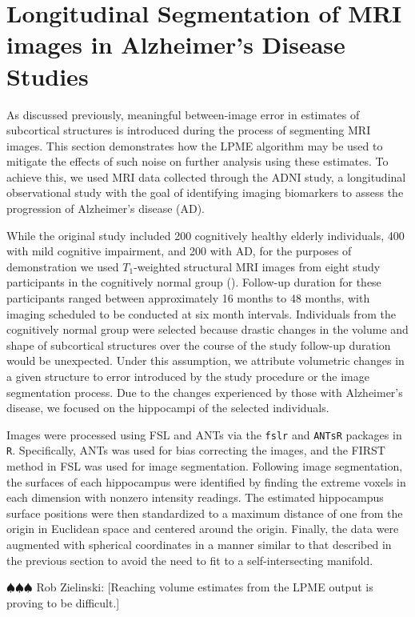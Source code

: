 \documentclass[11pt,reqno]{article}
\newcommand{\zielinski}[1]{{\color{blue} \sf $\spadesuit\spadesuit\spadesuit$ Rob Zielinski: [#1]}}
\theoremstyle{definition}
\begin{document}
\section{Longitudinal Segmentation of MRI images in Alzheimer's Disease Studies}\label{s:application}

As discussed previously, meaningful between-image error in estimates of subcortical structures is introduced during the process of segmenting MRI images. This section demonstrates how the LPME algorithm may be used to mitigate the effects of such noise on further analysis using these estimates. To achieve this, we used MRI data collected through the ADNI study, a longitudinal observational study with the goal of identifying imaging biomarkers to assess the progression of Alzheimer's disease (AD). 

While the original study included 200 cognitively healthy elderly individuals, 400 with mild cognitive impairment, and 200 with AD, for the purposes of demonstration we used $T_1$-weighted structural MRI images from eight study participants in the cognitively normal group (\cite{jack2008adni}). Follow-up duration for these participants ranged between approximately 16 months to 48 months, with imaging scheduled to be conducted at six month intervals. Individuals from the cognitively normal group were selected because drastic changes in the volume and shape of subcortical structures over the course of the study follow-up duration would be unexpected. Under this assumption, we attribute volumetric changes in a given structure to error introduced by the study procedure or the image segmentation process. Due to the changes experienced by those with Alzheimer's disease, we focused on the hippocampi of the selected individuals. 

Images were processed using FSL and ANTs via the \texttt{fslr} and \texttt{ANTsR} packages in \texttt{R}. Specifically, ANTs was used for bias correcting the images, and the FIRST method in FSL was used for image segmentation. Following image segmentation, the surfaces of each hippocampus were identified by finding the extreme voxels in each dimension with nonzero intensity readings. The estimated hippocampus surface positions were then standardized to a maximum distance of one from the origin in Euclidean space and centered around the origin. Finally, the data were augmented with spherical coordinates in a manner similar to that described in the previous section to avoid the need to fit to a self-intersecting manifold.

\zielinski{Reaching volume estimates from the LPME output is proving to be difficult.}
\end{document}
